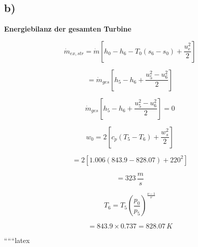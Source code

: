 

\subsection*{b)}

\textbf{Energiebilanz der gesamten Turbine}

\[
\dot{m}_{ex, str} = \dot{m} \left[ h_0 - h_6 - T_0 (s_6 - s_0) + \frac{u_e^2}{2} \right]
\]

\[
= \dot{m}_{ges} \left[ h_5 - h_6 + \frac{u_5^2 - u_6^2}{2} \right]
\]

\[
\dot{m}_{ges} \left[ h_5 - h_6 + \frac{u_5^2 - u_6^2}{2} \right] = 0
\]

\[
w_0 = 2 \left[ c_p (T_5 - T_6) + \frac{w_s^2}{2} \right]
\]

\[
= 2 \left[ 1.006 \left( 843.9 - 828.07 \right) + 220^2 \right]
\]

\[
= 323 \, \frac{m}{s}
\]

\[
T_6 = T_5 \left( \frac{p_0}{p_5} \right)^{\frac{\nu - 1}{\nu}}
\]

\[
= 843.9 \times 0.737 = 828.07 \, K
\]

``````latex